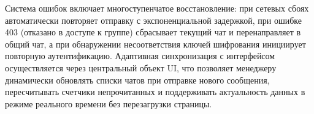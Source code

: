 Система ошибок включает многоступенчатое восстановление: при сетевых сбоях автоматически повторяет отправку с экспоненциальной задержкой, при ошибке 403 (отказано в доступе к группе) сбрасывает текущий чат и перенаправляет в общий чат, а при обнаружении несоответствия ключей шифрования инициирует повторную аутентификацию. Адаптивная синхронизация с интерфейсом осуществляется через центральный объект UI, что позволяет менеджеру динамически обновлять списки чатов при отправке нового сообщения, пересчитывать счетчики непрочитанных и поддерживать актуальность данных в режиме реального времени без перезагрузки страницы.
